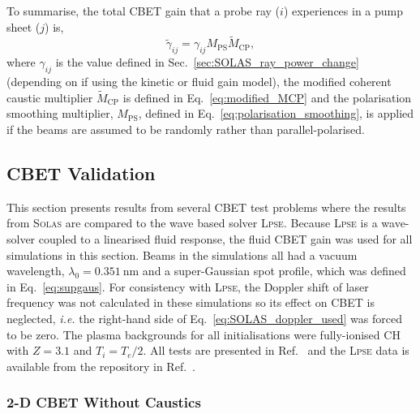 To summarise, the total \ac{CBET} gain that a probe ray ($i$) experiences in a pump sheet ($j$) is,
\begin{equation}
    \tilde{\gamma}_{ij} = \gamma_{ij} M_{\text{PS}} \tilde{M}_{\text{CP}},
\end{equation}
where $\gamma_{ij}$ is the value defined in Sec.~\ref{sec:SOLAS_ray_power_change} (depending on if using the kinetic or fluid gain model), the modified coherent caustic multiplier $\tilde{M}_{\text{CP}}$ is defined in Eq.~\ref{eq:modified_MCP} and the polarisation smoothing multiplier, $M_{\text{PS}}$, defined in Eq.~\ref{eq:polarisation_smoothing}, is applied if the beams are assumed to be randomly rather than parallel-polarised.

\subsection{CBET Validation}

This section presents results from several \ac{CBET} test problems where the results from \textsc{Solas} are compared to the wave based solver \textsc{Lpse}.
Because \textsc{Lpse} is a wave-solver coupled to a linearised fluid response, the fluid \ac{CBET} gain was used for all simulations in this section.
Beams in the simulations all had a vacuum wavelength, $\lambda_0=0.351\ \text{nm}$ and a super-Gaussian spot profile, which was defined in Eq.~\ref{eq:supgaus}.
For consistency with \textsc{Lpse}, the Doppler shift of laser frequency was not calculated in these simulations so its effect on \ac{CBET} is neglected, \textit{i.e.} the right-hand side of Eq.~\ref{eq:SOLAS_doppler_used} was forced to be zero.
The plasma backgrounds for all initialisations were fully-ionised CH with $Z=3.1$ and $T_i=T_e/2$.
All tests are presented in Ref.~\cite{follett_validation_2022} and the \textsc{Lpse} data is available from the repository in Ref.~\cite{follett_lpse_2022}.

\subsubsection{2-D CBET Without Caustics}

